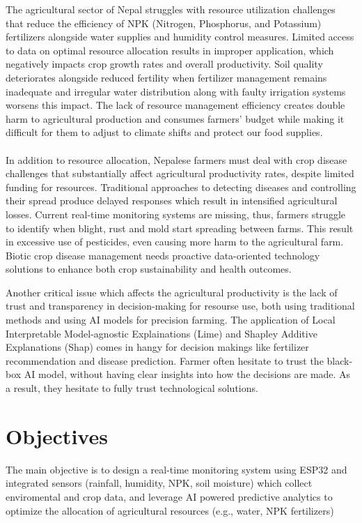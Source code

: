 The agricultural sector of Nepal struggles with resource utilization challenges that reduce the efficiency of NPK (Nitrogen, Phosphorus, and 
Potassium) fertilizers alongside water supplies and humidity control measures. Limited access to data on optimal resource allocation results 
in improper  application, which negatively impacts crop growth rates and overall productivity. Soil quality deteriorates alongside reduced 
fertility when fertilizer management remains inadequate and irregular water distribution along with faulty irrigation systems worsens this 
impact. The lack of resource management efficiency creates double harm to agricultural production and consumes farmers' budget while making
it difficult for them to adjust to climate shifts and protect our food supplies.  \\
\\
In addition to resource allocation, Nepalese farmers must deal with crop disease challenges that substantially affect agricultural productivity rates, despite limited funding for resources. Traditional approaches to detecting diseases and controlling their spread produce delayed responses which result in intensified agricultural losses. Current real-time monitoring systems are missing, thus, farmers struggle to identify when blight, rust and mold start spreading between farms. This result in excessive use of pesticides, even causing more harm to the agricultural farm. Biotic crop disease management needs proactive data-oriented technology solutions to enhance both crop sustainability and health outcomes. 

Another critical issue which affects the agricultural productivity is the lack of trust and transparency in decision-making for resourse use, 
both using traditional methods and using AI models for precision farming. The application of Local Interpretable  Model-agnostic Explainations
(Lime) and Shapley Additive Explanations (Shap) comes in hangy for decision makings like fertilizer recommendation and disease prediction. 
Farmer often hesitate to trust the black-box AI model, without having clear insights into how the decisions are made. As a result, they hesitate
to fully trust technological solutions.

\section{Objectives}
The main objective is to design a real-time monitoring system using ESP32 and integrated sensors (rainfall, humidity, NPK, soil moisture)
which collect enviromental and crop data, and leverage AI powered predictive analytics to optimize the allocation of agricultural 
resources (e.g., water, NPK fertilizers)

